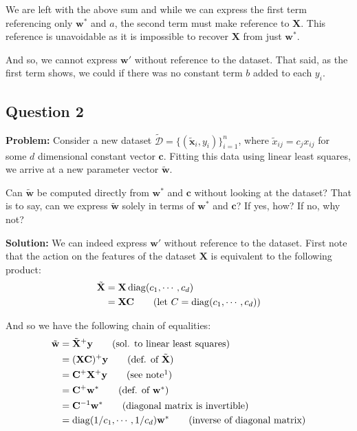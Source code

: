 \documentclass{article}
\renewcommand{\vec}[1]{\mathbf{#1}}
\newcommand{\mat}[1]{\mathbf{#1}}
\begin{document}
We are left with the above sum and while we can express the first term referencing only $\vec w^*$ and $a$, the second term must make reference to $\mat X$. This reference is unavoidable as it is impossible to recover $\mat X$ from just $\vec w^*$.

And so, we cannot express $\vec w'$ without reference to the dataset. That said, as the first term shows, we could if there was no constant term $b$ added to each $y_i$.
\smallskip
\newpage

\subsection*{Question 2}
\noindent\textbf{Problem:} Consider a new dataset $\tilde{\mathcal D}=\{(\tilde{\vec x}_i,y_i)\}^n_{i=1}$, where $\tilde{x}_{ij}=c_j x_{ij}$ for some $d$ dimensional constant vector $\vec c$. Fitting this data using linear least squares, we arrive at a new parameter vector $\tilde{\vec w}$.

Can $\tilde{\vec w}$ be computed directly from $\vec w^*$ and $\vec c$ without looking at the dataset? That is to say, can we express $\tilde{\vec w}$ solely in terms of $\vec w^*$ and $\vec c$? If yes, how? If no, why not?
\bigskip

\noindent\textbf{Solution:} We can indeed express $\vec w'$ without reference to the dataset. First note that the action on the features of the dataset $\mat X$ is equivalent to the following product:
\begin{align*}
    \tilde{\mat{X}}&=\mat X\operatorname{diag}(c_1,\cdots,c_d)\\
    &=\mat{XC}\tag{let $C=\operatorname{diag}(c_1,\cdots,c_d)$}
\end{align*}

And so we have the following chain of equalities:
\begin{align*}
    \tilde{\vec w}&=\tilde{\mat{X}}^+\vec y\tag{sol. to linear least squares}\\
    &=(\mat{X}\mat{C})^+\vec y\tag{def. of $\tilde{\mat{X}}$}\\
    &=\mat{C}^+\mat{X}^+\vec y\tag{see note$^1$}\\
    &=\mat{C}^+\vec w^*\tag{def. of $\vec w^*$}\\
    &=\mat{C}^{-1}\vec w^*\tag{diagonal matrix is invertible}\\
    &=\operatorname{diag}(1/c_1,\cdots,1/c_d)\vec w^*\tag{inverse of diagonal matrix}
\end{align*}
\end{document}
